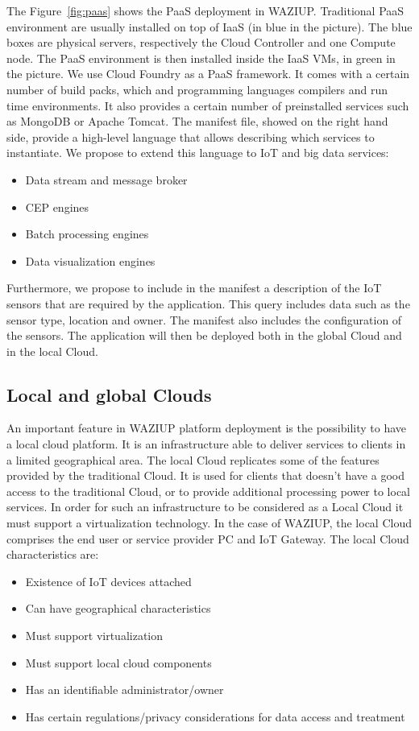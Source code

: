 The Figure~\ref{fig:paas} shows the PaaS deployment in WAZIUP.
Traditional PaaS environment are usually installed on top of IaaS (in blue in the picture).
The blue boxes are physical servers, respectively the Cloud Controller and one Compute node.
The PaaS environment is then installed inside the IaaS VMs, in green in the picture.
We use Cloud Foundry as a PaaS framework.
It comes with a certain number of build packs, which and programming languages compilers and run time environments.
It also provides a certain number of preinstalled services such as MongoDB or Apache Tomcat.
The manifest file, showed on the right hand side, provide a high-level language that allows describing which services to instantiate.
We propose to extend this language to IoT and big data services:
\begin{itemize}
  \item Data stream and message broker
  \item CEP engines
  \item Batch processing engines
  \item Data visualization engines
\end{itemize}

Furthermore, we propose to include in the manifest a description of the IoT sensors that are required by the application.
This query includes data such as the sensor type, location and owner.
The manifest also includes the configuration of the sensors.
The application will then be deployed both in the global Cloud and in the local Cloud.

\subsection{Local and global Clouds}

An important feature in WAZIUP platform deployment is the possibility to have a local cloud platform. 
It  is an infrastructure able to deliver services to clients in a limited geographical area. 
The local Cloud replicates some of the features provided by the traditional Cloud. 
It is used for clients that doesn't have a good access to the traditional Cloud, or to provide additional processing power to local services. 
In order for such an infrastructure to be considered as a Local Cloud it must support a virtualization technology. 
In the case of WAZIUP, the local Cloud comprises the end user or service provider PC and IoT Gateway. 
The local Cloud characteristics are:

\begin{itemize}
    \item Existence of IoT devices attached
    \item Can have geographical characteristics
    \item Must support virtualization
    \item Must support local cloud components
    \item Has an identifiable administrator/owner
    \item Has certain regulations/privacy considerations for data access and treatment
\end{itemize}

